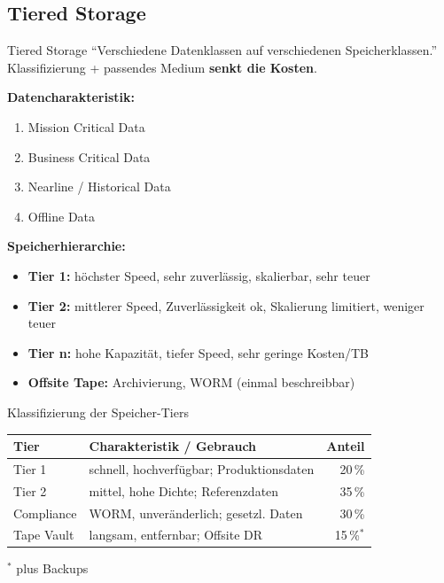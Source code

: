 \documentclass[a4paper, fontsize=7pt]{scrartcl}
\renewcommand*{\arraystretch}{1.5}  %
\begin{document}
\subsection{Tiered Storage}

\begin{mainbox}{Tiered Storage}
``Verschiedene Datenklassen auf verschiedenen Speicherklassen.''
Klassifizierung + passendes Medium \textbf{senkt die Kosten}.

\textbf{Datencharakteristik:}
\begin{enumerate}
    \item Mission Critical Data
    \item Business Critical Data
    \item Nearline / Historical Data
    \item Offline Data
\end{enumerate}
\textbf{Speicherhierarchie:}
\begin{itemize}
    \item \textbf{Tier 1:} höchster Speed, sehr zuverlässig, skalierbar,
          sehr teuer
    \item \textbf{Tier 2:} mittlerer Speed, Zuverlässigkeit ok, Skalierung
          limitiert, weniger teuer
    \item \textbf{Tier n:} hohe Kapazität, tiefer Speed, sehr geringe
          Kosten/TB
    \item \textbf{Offsite Tape:} Archivierung, WORM (einmal beschreibbar)
\end{itemize}
\end{mainbox}

\begin{mainbox}{Klassifizierung der Speicher-Tiers}
\renewcommand*{\arraystretch}{1.15}
\begin{tabularx}{\linewidth}{@{}l>{\raggedright\arraybackslash}X r@{}}
\textbf{Tier} & \textbf{Charakteristik / Gebrauch} & \textbf{Anteil} \\
\hline
Tier 1 & schnell, hochverfügbar; Produktionsdaten & 20\,\% \\
Tier 2 & mittel, hohe Dichte; Referenzdaten & 35\,\% \\
Compliance & WORM, unveränderlich; gesetzl. Daten & 30\,\% \\
Tape Vault & langsam, entfernbar; Offsite DR & 15\,\%$^*$ \\
\end{tabularx}
$^*$ plus Backups
\end{mainbox}
\end{document}
